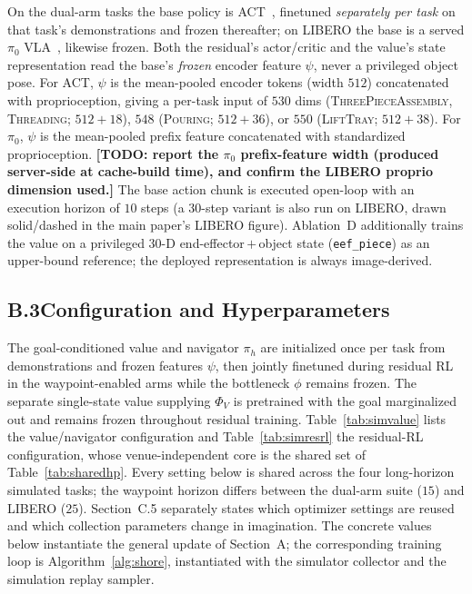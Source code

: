 \documentclass[letterpaper]{article} %
\newcommand{\todo}[1]{\textbf{[TODO: #1]}}
\begin{document}
On the dual-arm tasks the base policy is ACT~\cite{zhao2023learning}, finetuned
\emph{separately per task} on that task's demonstrations and frozen thereafter; on
LIBERO the base is a served $\pi_0$ VLA~\cite{black2024pi0}, likewise frozen. Both
the residual's actor/critic and the value's state representation read the base's
\emph{frozen} encoder feature $\psi$, never a privileged object pose. For ACT,
$\psi$ is the mean-pooled encoder tokens (width $512$) concatenated with
proprioception, giving a per-task input of $530$ dims (\textsc{ThreePieceAssembly},
\textsc{Threading}; $512{+}18$), $548$ (\textsc{Pouring}; $512{+}36$), or $550$
(\textsc{LiftTray}; $512{+}38$). For $\pi_0$, $\psi$ is the mean-pooled prefix
feature concatenated with standardized proprioception. \todo{report the $\pi_0$
prefix-feature width (produced server-side at cache-build time), and confirm the
LIBERO proprio dimension used.} The base action chunk is executed open-loop with an
execution horizon of $10$ steps (a $30$-step variant is also run on LIBERO, drawn
solid/dashed in the main paper's LIBERO figure). Ablation~D additionally trains the
value on a privileged $30$-D end-effector\,$+$\,object state (\texttt{eef\_piece}) as
an upper-bound reference; the deployed representation is always image-derived.

\subsection{B.3\quad Configuration and Hyperparameters}

The goal-conditioned value and navigator $\pi_h$ are initialized once per task from
demonstrations and frozen features $\psi$, then jointly finetuned during residual RL in
the waypoint-enabled arms while the bottleneck $\phi$ remains frozen. The separate
single-state value supplying $\Phi_V$ is pretrained with the goal marginalized out and
remains frozen throughout residual training. Table~\ref{tab:simvalue} lists
the value/navigator configuration and Table~\ref{tab:simresrl} the residual-RL
configuration, whose venue-independent core is the shared set of Table~\ref{tab:sharedhp}. Every setting below is shared across the four long-horizon simulated
tasks; the waypoint horizon differs between the dual-arm suite ($15$) and LIBERO ($25$).
Section~C.5 separately states which optimizer settings are reused and which collection
parameters change in imagination.
The concrete values below instantiate the general update of Section~A; the
corresponding training loop is Algorithm~\ref{alg:shore}, instantiated with the simulator
collector and the simulation replay sampler.
\end{document}
